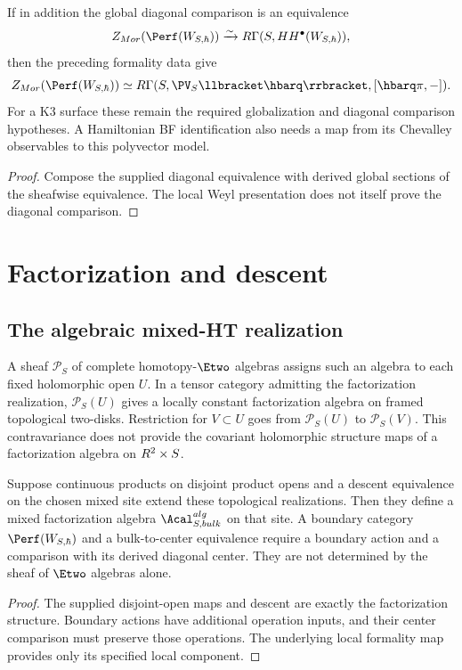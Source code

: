 \begin{corollary}
If in addition the global diagonal comparison is an equivalence
\[
 Z_{\mathrm{Mor}}(\Perf(\mathcal W_{S,\hbar}))
 \xrightarrow{\sim}\R\Gamma(S,
                   \mathcal{HH}^{\bullet}(\mathcal W_{S,\hbar})),
\]
then the preceding formality data give
\[
 Z_{\mathrm{Mor}}(\Perf(\mathcal W_{S,\hbar}))
 \simeq\R\Gamma(S,
       \PV_S\llbracket\hbarq\rrbracket,[\hbarq\pi,-]).
\]
For a K3 surface these remain the required globalization and diagonal
comparison hypotheses. A Hamiltonian BF identification also needs
a map from its Chevalley observables to this polyvector model.
\end{corollary}
\begin{proof}
Compose the supplied diagonal equivalence with derived global
sections of the sheafwise equivalence. The local Weyl presentation
does not itself prove the diagonal comparison.
\end{proof}

\chapter{Factorization and descent}
\section{The algebraic mixed-HT realization}
A sheaf \(\mathcal P_S\) of complete homotopy-\(\Etwo\) algebras
assigns such an algebra to each fixed holomorphic open \(U\).
In a tensor category admitting the factorization realization,
\(\mathcal P_S(U)\) gives a locally constant factorization algebra
on framed topological two-disks. Restriction for \(V\subset U\)
goes from \(\mathcal P_S(U)\) to \(\mathcal P_S(V)\). This
contravariance does not provide the covariant holomorphic structure
maps of a factorization algebra on \(R^2\times S\).

\begin{proposition}
Suppose continuous products on disjoint product opens and a descent
equivalence on the chosen mixed site extend these topological
realizations. Then they define a mixed factorization algebra
\(\Acal^{\mathrm{alg}}_{S,\mathrm{bulk}}\) on that site.
A boundary category \(\Perf(\mathcal W_{S,\hbar})\) and a
bulk-to-center equivalence require a boundary action and a comparison
with its derived diagonal center. They are not determined by the
sheaf of \(\Etwo\) algebras alone.
\end{proposition}
\begin{proof}
The supplied disjoint-open maps and descent are exactly the
factorization structure. Boundary actions have additional operation
inputs, and their center comparison must preserve those operations.
The underlying local formality map provides only its specified
local component.
\end{proof}

